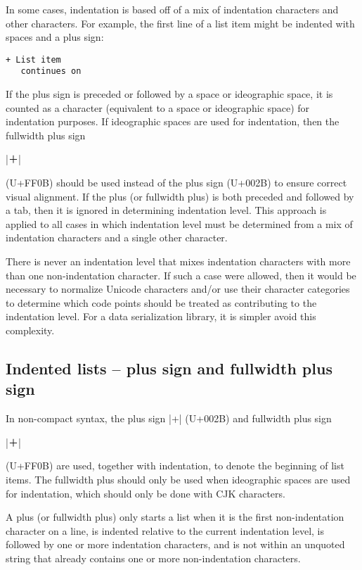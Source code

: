 \documentclass[11pt]{article}
\begin{document}
In some cases, indentation is based off of a mix of indentation characters and other characters.  For example, the first line of a list item might be indented with spaces and a plus sign:
\begin{Verbatim}[showspaces]
 + List item
   continues on
\end{Verbatim}
If the plus sign is preceded or followed by a space or ideographic space, it is counted as a character (equivalent to a space or ideographic space) for indentation purposes.  If ideographic spaces are used for indentation, then the fullwidth plus sign \begin{CJK*}{UTF8}{gkai}|＋|\end{CJK*} (U+FF0B) should be used instead of the plus sign (U+002B) to ensure correct visual alignment.  If the plus (or fullwidth plus) is both preceded and followed by a tab, then it is ignored in determining indentation level.  This approach is applied to all cases in which indentation level must be determined from a mix of indentation characters and a single other character.

There is never an indentation level that mixes indentation characters with more than one non-indentation character.  If such a case were allowed, then it would be necessary to normalize Unicode characters and/or use their character categories to determine which code points should be treated as contributing to the indentation level.  For a data serialization library, it is simpler avoid this complexity.


\subsection{Indented lists -- plus sign and fullwidth plus sign}

In non-compact syntax, the plus sign |+| (U+002B) and fullwidth plus sign \begin{CJK*}{UTF8}{gkai}|＋|\end{CJK*} (U+FF0B) are used, together with indentation, to denote the beginning of list items.  The fullwidth plus should only be used when ideographic spaces are used for indentation, which should only be done with CJK characters.

A plus (or fullwidth plus) only starts a list when it is the first non-indentation character on a line, is indented relative to the current indentation level, is followed by one or more indentation characters, and is not within an unquoted string that already contains one or more non-indentation characters.
\end{document}
